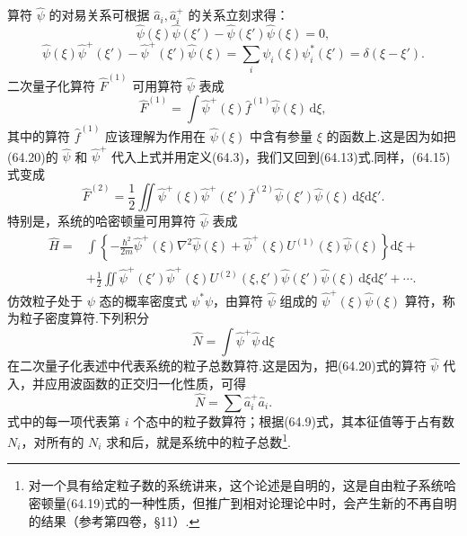 算符 $\hat{\psi}$ 的对易关系可根据 $\hat{a}_i,\hat{a}_i^{+}$ 的关系立刻求得：
\begin{equation}
  \hat{\psi}(\xi)\hat{\psi}(\xi')-\hat{\psi}(\xi')\hat{\psi}(\xi)=0,
\end{equation}
\begin{equation}
  \hat{\psi}(\xi)\hat{\psi}^{+}(\xi')-\hat{\psi}^{+}(\xi')\hat{\psi}(\xi)=\sum_i\psi_i(\xi)\psi_i^{*}(\xi')=\delta(\xi-\xi').
\end{equation}
二次量子化算符 $\hat{F}^{(1)}$ 可用算符 $\hat{\psi}$ 表成
\begin{equation}
  \hat{F}^{(1)}=\int\hat{\psi}^{+}(\xi)\hat{f}^{(1)}\hat{\psi}(\xi)\,\mathrm{d}\xi,
\end{equation}
其中的算符 $\hat{f}^{(1)}$ 应该理解为作用在 $\hat{\psi}(\xi)$ 中含有参量 $\xi$ 的函数上.这是因为如把(64.20)的 $\hat{\psi}$ 和 $\hat{\psi}^{+}$ 代入上式并用定义(64.3)，我们又回到(64.13)式.同样，(64.15)式变成
\begin{equation}
  \hat{F}^{(2)}=\frac{1}{2}\iint\hat{\psi}^{+}(\xi)\hat{\psi}^{+}(\xi')\hat{f}^{(2)}\hat{\psi}(\xi')\hat{\psi}(\xi)\,\mathrm{d}\xi\mathrm{d}\xi'.
\end{equation}
特别是，系统的哈密顿量可用算符 $\hat{\psi}$ 表成
\begin{equation}
\begin{aligned}
  \hat{H}={}&\int\left\{-\frac{\hbar^2}{2m}\hat{\psi}^{+}(\xi)\nabla^2\hat{\psi}(\xi)
  +\hat{\psi}^{+}(\xi)U^{(1)}(\xi)\hat{\psi}(\xi)\right\}\mathrm{d}\xi+{}\\
  &+\frac{1}{2}\iint\hat{\psi}^{+}(\xi')\hat{\psi}^{+}(\xi)U^{(2)}(\xi,\xi')\hat{\psi}(\xi')\hat{\psi}(\xi)\,\mathrm{d}\xi\mathrm{d}\xi'+\cdots.
\end{aligned}
\end{equation}
仿效粒子处于 $\psi$ 态的概率密度式 $\psi^{*}\psi$，由算符 $\hat{\psi}$ 组成的 $\hat{\psi}^{+}(\xi)\hat{\psi}(\xi)$ 算符，称为粒子密度算符.下列积分
\begin{equation}
  \hat{N}=\int\hat{\psi}^{+}\hat{\psi}\,\mathrm{d}\xi
\end{equation}
在二次量子化表述中代表系统的粒子总数算符.这是因为，把(64.20)式的算符 $\hat{\psi}$ 代入，并应用波函数的正交归一化性质，可得
\begin{equation*}
  \hat{N}=\sum\hat{a}_i^{+}\hat{a}_i.
\end{equation*}
式中的每一项代表第 $i$ 个态中的粒子数算符；根据(64.9)式，其本征值等于占有数 $N_i$，对所有的 $N_i$ 求和后，就是系统中的粒子总数\footnote{对一个具有给定粒子数的系统讲来，这个论述是自明的，这是自由粒子系统哈密顿量(64.19)式的一种性质，但推广到相对论理论中时，会产生新的不再自明的结果（参考第四卷，§11）.}.

